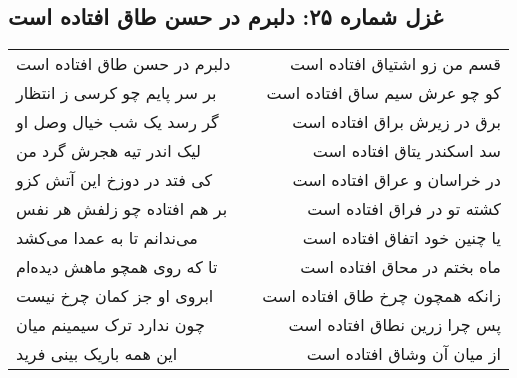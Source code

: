 \begin{center}
\section*{غزل شماره ۲۵: دلبرم در حسن طاق افتاده است}
\label{sec:025}
\begin{longtable}{l p{0.5cm} r}
دلبرم در حسن طاق افتاده است
&&
قسم من زو اشتیاق افتاده است
\\
بر سر پایم چو کرسی ز انتظار
&&
کو چو عرش سیم ساق افتاده است
\\
گر رسد یک شب خیال وصل او
&&
برق در زیرش براق افتاده است
\\
لیک اندر تیه هجرش گرد من
&&
سد اسکندر یتاق افتاده است
\\
کی فتد در دوزخ این آتش کزو
&&
در خراسان و عراق افتاده است
\\
بر هم افتاده چو زلفش هر نفس
&&
کشته تو در فراق افتاده است
\\
می‌ندانم تا به عمدا می‌کشد
&&
یا چنین خود اتفاق افتاده است
\\
تا که روی همچو ماهش دیده‌ام
&&
ماه بختم در محاق افتاده است
\\
ابروی او جز کمان چرخ نیست
&&
زانکه همچون چرخ طاق افتاده است
\\
چون ندارد ترک سیمینم میان
&&
پس چرا زرین نطاق افتاده است
\\
این همه باریک بینی فرید
&&
از میان آن وشاق افتاده است
\\
\end{longtable}
\end{center}

